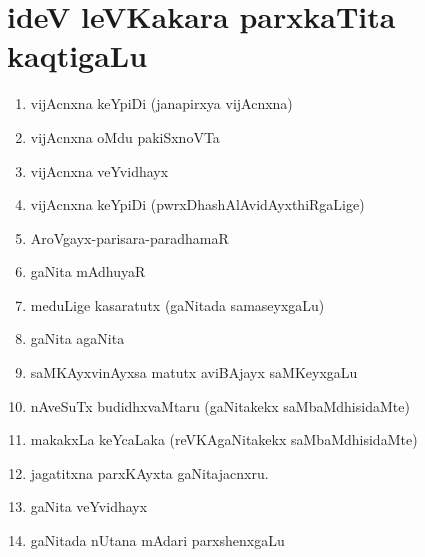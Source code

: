 \chapter*{ideV leVKakara parxkaTita kaqtigaLu}

\begin{enumerate}[{\rm 1)}]
\item vijAcnxna keYpiDi (janapirxya vijAcnxna)
\item vijAcnxna oMdu pakiSxnoVTa
\item vijAcnxna veYvidhayx
\item vijAcnxna keYpiDi (pwrxDhashAlAvidAyxthiRgaLige)
\item AroVgayx-parisara-paradhamaR
\item gaNita mAdhuyaR
\item meduLige kasaratutx (gaNitada samaseyxgaLu)
\item gaNita agaNita
\item saMKAyxvinAyxsa matutx aviBAjayx saMKeyxgaLu
\item nAveSuTx budidhxvaMtaru (gaNitakekx saMbaMdhisidaMte)
\item makakxLa keYcaLaka (reVKAgaNitakekx saMbaMdhisidaMte)
\item jagatitxna parxKAyxta gaNitajacnxru.
\item gaNita veYvidhayx 
\item gaNitada nUtana mAdari parxshenxgaLu
\end{enumerate}
